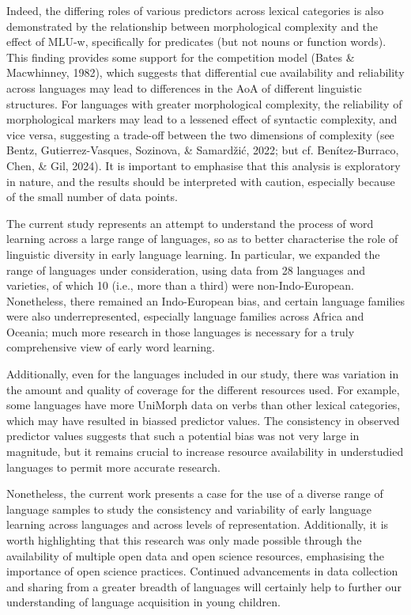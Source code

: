 \documentclass[10pt, letterpaper]{article}
\begin{document}
Indeed, the differing roles of various predictors across lexical
categories is also demonstrated by the relationship between
morphological complexity and the effect of MLU-w, specifically for
predicates (but not nouns or function words). This finding provides some
support for the competition model (Bates \& Macwhinney, 1982), which
suggests that differential cue availability and reliability across
languages may lead to differences in the AoA of different linguistic
structures. For languages with greater morphological complexity, the
reliability of morphological markers may lead to a lessened effect of
syntactic complexity, and vice versa, suggesting a trade-off between the
two dimensions of complexity (see Bentz, Gutierrez-Vasques, Sozinova, \&
Samardžić, 2022; but cf. Benítez-Burraco, Chen, \& Gil, 2024). It is
important to emphasise that this analysis is exploratory in nature, and
the results should be interpreted with caution, especially because of
the small number of data points.

The current study represents an attempt to understand the process of
word learning across a large range of languages, so as to better
characterise the role of linguistic diversity in early language
learning. In particular, we expanded the range of languages under
consideration, using data from 28 languages and varieties, of which 10
(i.e., more than a third) were non-Indo-European. Nonetheless, there
remained an Indo-European bias, and certain language families were also
underrepresented, especially language families across Africa and
Oceania; much more research in those languages is necessary for a truly
comprehensive view of early word learning.

Additionally, even for the languages included in our study, there was
variation in the amount and quality of coverage for the different
resources used. For example, some languages have more UniMorph data on
verbs than other lexical categories, which may have resulted in biassed
predictor values. The consistency in observed predictor values suggests
that such a potential bias was not very large in magnitude, but it
remains crucial to increase resource availability in understudied
languages to permit more accurate research.

Nonetheless, the current work presents a case for the use of a diverse
range of language samples to study the consistency and variability of
early language learning across languages and across levels of
representation. Additionally, it is worth highlighting that this
research was only made possible through the availability of multiple
open data and open science resources, emphasising the importance of open
science practices. Continued advancements in data collection and sharing
from a greater breadth of languages will certainly help to further our
understanding of language acquisition in young children.
\end{document}
